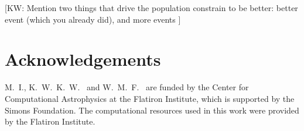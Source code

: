 \documentclass[aps,prd,twocolumn,superscriptaddress,preprintnumbers,floatfix,nofootinbib]{revtex4-2}
\newcommand{\kw}[1]{{\color{rb4}[KW: #1 ]}}
\begin{document}
\kw{Mention two things that drive the population constrain to be better: better event (which you already did), and more events}

\section{Acknowledgements}
\label{sec:Acknowledgements}
M.~I., K.~W.~K.~W.~ and W.~M.~F.~ are funded by the Center for Computational Astrophysics at the Flatiron Institute, which is supported by the Simons Foundation.
The computational resources used in this work were provided by the Flatiron Institute.


\end{document}
